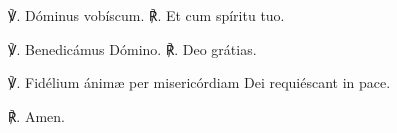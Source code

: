 ℣. Dóminus vobíscum. ℟. Et cum spíritu tuo.


℣. Benedicámus Dómino. ℟. Deo grátias.

℣. Fidélium ánimæ per misericórdiam Dei requiéscant in pace.

℟. Amen.

